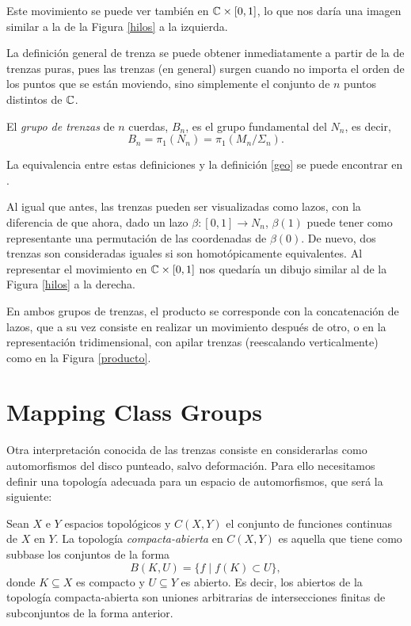 \documentclass[TFG.tex]{subfiles}
\begin{document}
Este movimiento se puede ver también en $\mathbb{C}\times[0,1]$, lo que nos daría una imagen similar a la de la Figura \ref{hilos} a la izquierda.

La definición general de trenza se puede obtener inmediatamente a partir de la de trenzas puras, pues las trenzas (en general) surgen cuando no importa el orden de los puntos que se están moviendo, sino simplemente el conjunto de $n$ puntos distintos de $\mathbb{C}$.

\begin{defi}
El \emph{grupo de trenzas} de $n$ cuerdas, $B_n$,  es el grupo fundamental del $N_n$, es decir,
$$B_n=\pi_1(N_n)=\pi_1(M_n/\Sigma_n).$$
\end{defi}

La equivalencia entre estas definiciones y la definición \ref{geo} se puede encontrar en \cite{Zariski}.

Al igual que antes, las trenzas pueden ser visualizadas como lazos, con la diferencia de que ahora, dado un lazo $\beta:[0,1]\to N_n$, $\beta(1)$ puede tener como representante una permutación de las coordenadas de $\beta(0)$. De nuevo, dos trenzas son consideradas iguales si son homotópicamente equivalentes. Al representar el movimiento en $\mathbb{C}\times[0,1]$ nos quedaría un dibujo similar al de la Figura \ref{hilos} a la derecha.

En ambos grupos de trenzas, el producto se corresponde con la concatenación de lazos, que a su vez consiste en realizar un movimiento después de otro, o en la representación tridimensional, con apilar trenzas (reescalando verticalmente) como en la Figura \ref{producto}. 




\section{Mapping Class Groups}

Otra interpretación conocida de las trenzas consiste en considerarlas como automorfismos del disco punteado, salvo deformación. Para ello necesitamos definir una topología adecuada para un espacio de automorfismos, que será la siguiente:

\begin{defi}
Sean $X$ e $Y$ espacios topológicos y $C(X,Y)$ el conjunto de funciones continuas de $X$ en $Y$. La topología \emph{compacta-abierta} en $C(X,Y)$ es aquella que tiene como subbase los conjuntos de la forma
$$B(K,U)=\{f\mid f(K)\subset U\},$$
donde $K\subseteq X$ es compacto y $U\subseteq Y$ es abierto. Es decir, los abiertos de la topología compacta-abierta son uniones arbitrarias de intersecciones finitas de subconjuntos de la forma anterior.
\end{defi}
\end{document}
